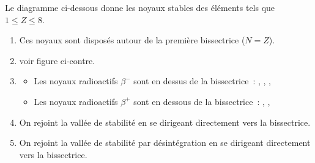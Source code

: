 \begin{minipage}{0.54\linewidth}
Le diagramme ci-dessous donne les noyaux stables des éléments tels que
$1\leqslant Z\leqslant8$.

    \begin{enumerate}
    \item Ces noyaux sont disposés autour de la première bissectrice ($N=Z$).
    \item voir figure ci-contre.
    \item 
          \begin{itemize}
              \item Les noyaux radioactifs $\beta^{-}$ sont en dessus de la
                    bissectrice~:  , , ,
              \item Les noyaux radioactifs $\beta^{+}$ sont en dessous de la
                    bissectrice~:  , , 
          \end{itemize}

    \item {}  

           On rejoint la vallée de stabilité en se dirigeant directement vers la
           bissectrice.

    \item {}

          On rejoint la vallée de stabilité par désintégration en se dirigeant
          directement vers la bissectrice.
\end{enumerate}
\end{minipage}
\hfill
